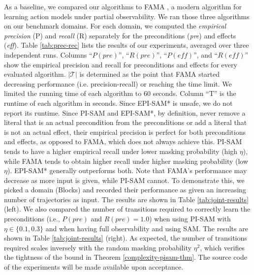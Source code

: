 \documentclass{article}
\theoremstyle{plain}
\theoremstyle{definition}
\theoremstyle{remark}
\theoremstyle{observation}
\newcommand{\pre}{\textit{pre}}
\newcommand{\eff}{\textit{eff}}
\begin{document}
As a baseline, we compared our algorithms to FAMA \citep{aineto2019learning}, a modern algorithm for learning action models under partial observability. We ran those three algorithms on our benchmark domains. %
For each domain, we computed the \textit{empirical precision} (P) and \textit{recall} (R) separately for the preconditions (\pre) and effects (\eff). 
Table \ref{tab:prec-rec} lists the results of our experiments, averaged over three independent runs. 
Columns ``$P(\pre)$'', ``$R(\pre)$'', ``$P(\eff)$'', and ``$R(\eff)$'' show the empirical precision and recall for preconditions and effects for every evaluated algorithm. 
$|\mathcal{T}|$ is determined as the point that FAMA started decreasing performance (i.e. precision-recall) or reaching the time limit. We limited the running time of each algorithm to 60 seconds. Column ``T'' is the runtime of each algorithm in seconds. %
Since EPI-SAM* is unsafe, we do not report its runtime. %
Since PI-SAM and EPI-SAM*, by definition, never remove a literal that is an actual precondition from the preconditions or add a literal that is not an actual effect, their empirical precision is perfect for both preconditions and effects, as opposed to FAMA, which does not always achieve this. 
PI-SAM tends to have a higher empirical recall under lower masking probability (high $\eta$), while FAMA tends to obtain higher recall under higher masking probability (low $\eta$). EPI-SAM* generally outperforms both. 
Note that FAMA's performance may decrease as more input is given, while PI-SAM cannot. 
To demonstrate this, we picked a domain (Blocks) and recorded their performance as given an increasing number of trajectories as input. The results are shown in Table \ref{tab:joint-results}(left). 
We also compared the number of transitions required to correctly learn the preconditions (i.e., $P(\pre)$ and $R(\pre) = 1.0$)
when using PI-SAM with $\eta\in\{0.1, 0.3\}$ and when having full observability and using SAM. 
The results are shown in Table \ref{tab:joint-results} (right). As expected, the number of transitions required scales inversely with the random masking probability $\eta^2$, which verifies the tightness of the bound in Theorem \ref{complexity-pisam-thm}. 
The source code of the experiments will be made available upon acceptance.
\end{document}
